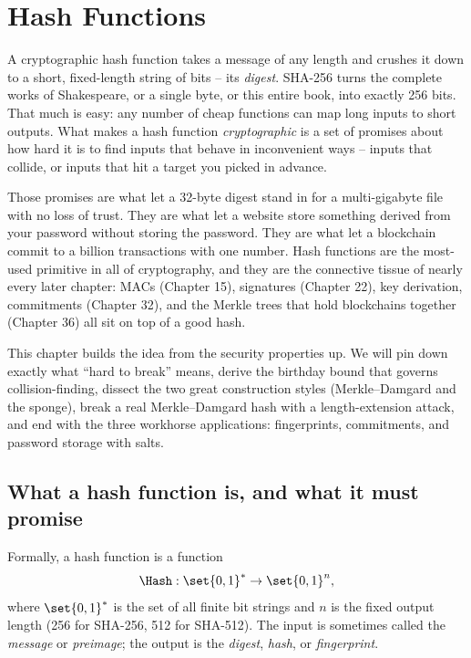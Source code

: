 \chapter{Hash Functions}

A cryptographic hash function takes a message of any length and crushes it down to a short, fixed-length string of bits -- its \emph{digest}. SHA-256 turns the complete works of Shakespeare, or a single byte, or this entire book, into exactly 256 bits. That much is easy: any number of cheap functions can map long inputs to short outputs. What makes a hash function \emph{cryptographic} is a set of promises about how hard it is to find inputs that behave in inconvenient ways -- inputs that collide, or inputs that hit a target you picked in advance.

Those promises are what let a 32-byte digest stand in for a multi-gigabyte file with no loss of trust. They are what let a website store something derived from your password without storing the password. They are what let a blockchain commit to a billion transactions with one number. Hash functions are the most-used primitive in all of cryptography, and they are the connective tissue of nearly every later chapter: MACs (Chapter 15), signatures (Chapter 22), key derivation, commitments (Chapter 32), and the Merkle trees that hold blockchains together (Chapter 36) all sit on top of a good hash.

This chapter builds the idea from the security properties up. We will pin down exactly what ``hard to break'' means, derive the birthday bound that governs collision-finding, dissect the two great construction styles (Merkle--Damgard and the sponge), break a real Merkle--Damgard hash with a length-extension attack, and end with the three workhorse applications: fingerprints, commitments, and password storage with salts.

\chapterline

\section{What a hash function is, and what it must promise}
\label{ch14:properties}

Formally, a hash function is a function
\[
  \Hash : \set{0,1}^{*} \to \set{0,1}^{n},
\]
where $\set{0,1}^{*}$ is the set of all finite bit strings and $n$ is the fixed output length (256 for SHA-256, 512 for SHA-512). The input is sometimes called the \emph{message} or \emph{preimage}; the output is the \emph{digest}, \emph{hash}, or \emph{fingerprint}.

